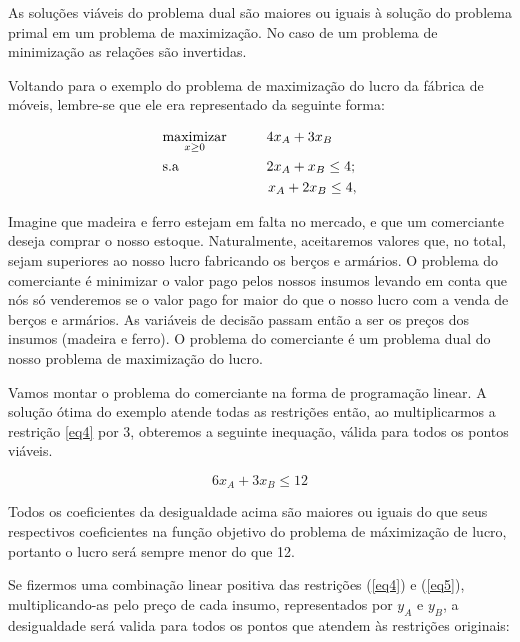 \begin{teo}
As soluções viáveis do problema dual são maiores ou iguais à solução do problema primal em um problema de maximização. No caso de um problema de minimização as relações são invertidas. 
\end{teo}


Voltando para o exemplo do problema de maximização do lucro da fábrica de móveis, lembre-se que ele era representado da seguinte forma:

\begin{align}
    & \underset{x\geq0}{\text{maximizar}} \hspace{1cm} 4x_A+3x_B \label{eq4} \\
    & \text{s.a}  \hspace{2.2cm} 2x_A+x_B \leq 4; \label{eq5} \\
    &             \hspace{2.65cm} x_A+2x_B\leq 4, \label{eq6}
\end{align}

Imagine que madeira e ferro estejam em falta no mercado, e que um comerciante deseja comprar o nosso estoque. Naturalmente, aceitaremos valores que, no total, sejam superiores ao nosso lucro fabricando os berços e armários. O problema do comerciante é minimizar o valor pago pelos nossos insumos levando em conta que nós só venderemos se o valor pago for maior do que o nosso lucro com a venda de berços e armários. As variáveis de decisão passam então a ser os preços dos insumos (madeira e ferro). O problema do comerciante é um problema dual do nosso problema de maximização do lucro. 

Vamos montar o problema do comerciante na forma de programação linear. A solução ótima do exemplo atende todas as restrições então, ao multiplicarmos a restrição \ref{eq4} por 3, obteremos a seguinte inequação, válida para todos os pontos viáveis.

\begin{equation}
6x_{A}+3x_{B}\leq12
\label{eq:dual1}
\end{equation}

Todos os coeficientes da desigualdade acima são maiores ou iguais do que seus respectivos coeficientes na função objetivo do problema de máximização de lucro, portanto o lucro será sempre menor do que 12.

Se fizermos uma combinação linear positiva das restrições (\ref{eq4}) e (\ref{eq5}), multiplicando-as pelo preço de cada insumo, representados por $y_A$ e $y_B$, a desigualdade será valida para todos os pontos que atendem às restrições originais:

